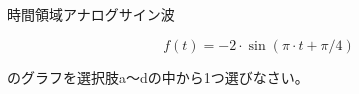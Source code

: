 時間領域アナログサイン波

\[
f(t) = -2 \cdot \sin( \pi \cdot t + \pi/4 )
\]

\bigskip
\noindent  のグラフを選択肢a〜dの中から1つ選びなさい。
